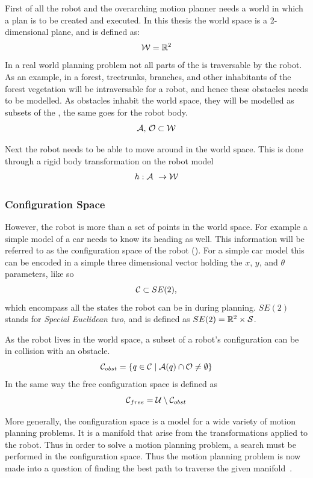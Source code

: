 First of all the robot and the overarching motion planner needs a world in which
a plan is to be created and executed. In this thesis the world space is a
2-dimensional plane, and is defined as:
\[
  \mathcal{W} = \mathbb{R}^2
\]
In a real world planning problem not all parts of the \modelworld{} is
traversable by the robot. As an example, in a forest, treetrunks, branches, and
other inhabitants of the forest vegetation will be intraversable for a robot,
and hence these obstacles needs to be modelled. As obstacles inhabit the world
space, they will be modelled as subsets of the \modelworld, the same goes for
the robot body.
\[
  \mathcal{A},\, \mathcal{O} \subset \mathcal{W}
\]

Next the robot needs to be able to move around in the world space. This is done
through a rigid body transformation on the robot model
\[
  h : \mathcal{A}\ \rightarrow \mathcal{W}
\]


\subsubsection{Configuration Space}

However, the robot is more than a set of points in the world space. For example
a simple model of a car needs to know its heading as well. This information will
be referred to as the configuration space of the robot
(\modelconfigurationspace). For a simple car model this can be encoded in a
simple three dimensional vector holding the \(x\), \(y\), and \(\theta\)
parameters, like so
\[
  \mathcal{C} \subset SE(2),
\]
which encompass all the states the robot can be in during planning. \(SE(2)\) stands
for \textit{Special Euclidean two}, and is defined as \(SE(2) = \mathbb{R}^2 \times
\mathcal{S}\).

As the robot lives in the world space, a subset of a robot's configuration can
be in collision with an obstacle.
\[
  \mathcal{C}_{obst}{} = \lbrace q \in \mathcal{C}{} \mid
    \mathcal{A}(q) \cap \mathcal{O}{} \neq \emptyset\rbrace
\]
In the same way the free configuration space is defined as
\[
  \mathcal{C}_{free}{} = \mathcal{U} \setminus
  \mathcal{C}_{obst}{}
\]

More generally, the configuration space is a model for a wide variety of motion
planning problems. It is a manifold that arise from the transformations applied
to the robot. Thus in order to solve a motion planning problem, a search must be
performed in the configuration space. Thus the motion planning problem is now
made into a question of finding the best path to traverse the given
manifold~\cite{Lav06}.

